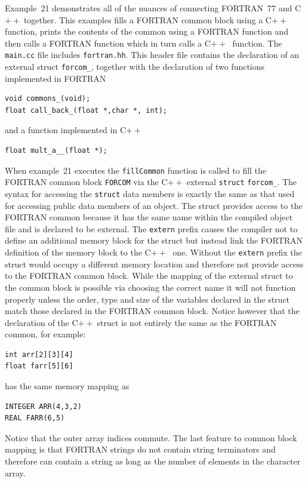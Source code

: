 \documentclass[11pt,a4paper]{scrartcl}
\def\cpp{C$++\;$}
\begin{document}
Example~21 demonstrates all of the nuances of connecting FORTRAN~77 and
\cpp together.  This examples fills a FORTRAN common block using a
\cpp function, prints the contents of the common using a FORTRAN
function and then calls a FORTRAN function which in turn calls a \cpp
function.  The \texttt{main.cc} file includes \texttt{fortran.hh}.
This header file contains the declaration of an external struct
\texttt{forcom\_}, together with the
declaration of two functions implemented in FORTRAN
%
\begin{verbatim}
void commons_(void);
float call_back_(float *,char *, int);
\end{verbatim}
%
and a function implemented in \cpp
%
\begin{verbatim}
float mult_a__(float *);
\end{verbatim}
%
When example~21 executes the \texttt{fillCommon} function is called to
fill the FORTRAN common block \texttt{FORCOM} via the \cpp external
\texttt{struct} \texttt{forcom\_}.  The syntax for accessing the
\texttt{struct} data members is exactly the same as that used for accessing
public data members of an object.  The struct provides access to the
FORTRAN common because it has the same name within the compiled object
file and is declared to be external.  The \texttt{extern} prefix causes the
compiler not to define an additional memory block for the struct but
instead link the FORTRAN definition of the memory block to the \cpp
one.  Without the \texttt{extern} prefix the struct would occupy a
different memory location and therefore not provide access to the
FORTRAN common block.  While the mapping of the external struct to the
common block is possible via choosing the correct name it will not
function properly unless the order, type and size of the variables
declared in the struct match those declared in the FORTRAN common
block.  Notice however that the declaration of the \cpp struct is not
entirely the same as the FORTRAN common, for example:
%
\begin{verbatim}
int arr[2][3][4]
float farr[5][6]
\end{verbatim}
%
has the same memory mapping as
% 
\begin{verbatim}
INTEGER ARR(4,3,2)
REAL FARR(6,5)
\end{verbatim}
%
Notice that the outer array indices commute.  The last feature to
common block mapping is that FORTRAN strings do not contain string
terminators and therefore can contain a string as long as the number
of elements in the character array.
\end{document}
